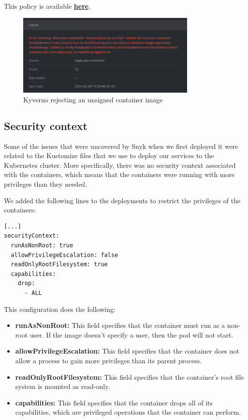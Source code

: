 \documentclass[12pt,x11names]{article}
\begin{document}
This policy is available \href{https://github.com/thomas-mauran/LinkedOut/blob/main/kube/prod/kyverno-policy.yml}{\textbf{here}}.

\begin{figure}[H]
  \centering
  \includegraphics[width=0.8\textwidth]{imgs/kyverno_signature_rejection.png}
  \caption{Kyverno rejecting an unsigned container image}
\end{figure}

\subsection{Security context}

Some of the issues that were uncovered by Snyk when we first deployed it were related to
the Kustomize files that we use to deploy our services to the Kubernetes cluster. More
specifically, there was no security context associated with the containers, which means
that the containers were running with more privileges than they needed.

\medskip
We added the following lines to the deployments to restrict the privileges of the containers:

\begin{lstlisting}
[...]
securityContext:
  runAsNonRoot: true
  allowPrivilegeEscalation: false
  readOnlyRootFilesystem: true
  capabilities:
    drop:
      - ALL
\end{lstlisting}

This configuration does the following:

\begin{itemize}
  \item \textbf{runAsNonRoot:} This field specifies that the container must run as a
  non-root user. If the image doesn't specify a user, then the pod will not start.
  \item \textbf{allowPrivilegeEscalation:} This field specifies that the container
  does not allow a process to gain more privileges than its parent process.
  \item \textbf{readOnlyRootFilesystem:} This field specifies that the container's root
  file system is mounted as read-only.
  \item \textbf{capabilities:} This field specifies that the container drops all of its
  capabilities, which are privileged operations that the container can perform.
\end{itemize}
\end{document}
